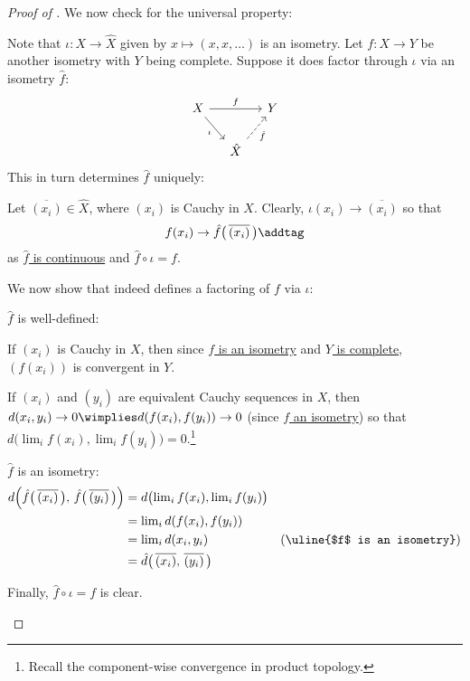 \begin{proof}[Proof of ]
		\noindent We now check for the universal property:
		\begin{subproof}
			Note that $\iota\colon X\to\hat X$ given by $x\mapsto (x, x, \ldots)$ is an isometry. Let $f\colon X\to Y$ be another isometry with $Y$ being complete. Suppose it does factor through $\iota$ via an isometry $\hat f$:
			\[
			\begin{tikzcd}[column sep=small]
				X\ar[dr, "\iota"']\ar[rr, "f"] && Y\\
				& \hat X\ar[ur, dashed, "\hat f"'] &
			\end{tikzcd}
			\]
			This in turn determines $\hat f$ uniquely:
			\begin{subproof}
				Let $\overline{(x_i)}\in\hat X$, where $(x_i)$ is Cauchy in $X$. Clearly, $\iota(x_i)\to\overline{(x_i)}$ so that
				\[
				f(x_i)\to \hat f\bigl(\, \overline{(x_i)} \,\bigr) \addtag\label{EQN: metric completion proof}
				\]
				as \uline{$\hat f$ is continuous} and \uline{$\hat f\circ \iota = f$}.
			\end{subproof}
			We now show that  indeed defines a factoring of $f$ via $\iota$:
			\begin{prooflist}
				\item $\hat f$ is well-defined:
				\begin{rmklist}
					\item If $(x_i)$ is Cauchy in $X$, then since \uline{$f$ is an isometry} and \uline{$Y$ is complete}, $(f(x_i))$ is convergent in $Y$.
					
					\item If $(x_i)$ and $(y_i)$ are equivalent Cauchy sequences in $X$, then $d(x_i, y_i)\to 0\wimplies d(f(x_i), f(y_i))\to 0$ (since \uline{$f$ an isometry}) so that $d\bigl(\lim_i f(x_i), \lim_i f(y_i)\bigr) = 0$.\footnote{Recall the component-wise convergence in product topology.}
				\end{rmklist}
				
				\item $\hat f$ is an isometry:
				\begin{alignat*}{2}
					d\Bigl( \hat f\bigl(\, \overline{(x_i)} \,\bigr),\, \hat f\bigl(\, \overline{(y_i)} \,\bigr) \Bigr)
					& = d\bigl(\lim\nolimits_i f(x_i), \lim\nolimits_i f(y_i)\bigr)\\
					& = \lim\nolimits_i d(f(x_i), f(y_i))\\
					& = \lim\nolimits_i d(x_i, y_i) & \text{(\uline{$f$ is an isometry})}\\
					& = \hat d\bigl(\, \overline{(x_i)},\, \overline{(y_i)} \,\bigr)
				\end{alignat*}
				
				\item Finally, $\hat f\circ \iota = f$ is clear.\qedhere
			\end{prooflist}
		\end{subproof}
	\end{proof}
	

